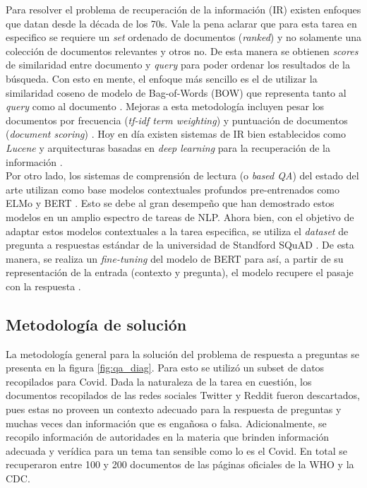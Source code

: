 Para resolver el problema de recuperación de la información (IR) existen enfoques que datan desde la década de los 70s. Vale la pena aclarar que para esta tarea en especifico se requiere un \textit{set} ordenado de documentos (\textit{ranked}) y no solamente una colección de documentos relevantes y otros no. De esta manera se obtienen \textit{scores} de similaridad entre documento y \textit{query} para poder ordenar los resultados de la búsqueda. Con esto en mente, el enfoque más sencillo es el de utilizar la similaridad coseno de modelo de Bag-of-Words (BOW) que representa tanto al \textit{query} como al documento \cite{}. Mejoras a esta metodología incluyen pesar los documentos por frecuencia (\textit{tf-idf term weighting}) y puntuación de documentos (\textit{document scoring}) \cite{}. Hoy en día existen sistemas de IR bien establecidos como \textit{Lucene} \cite{lucene} y arquitecturas basadas en \textit{deep learning} para la recuperación de la información \cite{DL_IR}. \\

Por otro lado, los sistemas de comprensión de lectura (o \textit{based QA}) del estado del arte utilizan como base modelos contextuales profundos pre-entrenados como ELMo y BERT \cite{BertQA}. Esto se debe al gran desempeño que han demostrado estos modelos en un amplio espectro de tareas de NLP. Ahora bien, con el objetivo de adaptar estos modelos contextuales a la tarea especifica, se utiliza el \textit{dataset} de pregunta a respuestas estándar de la universidad de Standford SQuAD \cite{squad}. De esta manera, se realiza un \textit{fine-tuning} del modelo de BERT para así, a partir de su representación de la entrada (contexto y pregunta), el modelo recupere el pasaje con la respuesta \cite{BERT_on_SQUAD}.

\subsection{Metodología de solución}

La metodología general para la solución del problema de respuesta a preguntas se presenta en la figura \ref{fig:qa_diag}. Para esto se utilizó un subset de datos recopilados para Covid. Dada la naturaleza de la tarea en cuestión, los documentos recopilados de las redes sociales Twitter y Reddit fueron descartados, pues estas no proveen un contexto adecuado para la respuesta de preguntas y muchas veces dan información que es engañosa o falsa. Adicionalmente, se recopilo información de autoridades en la materia que brinden información adecuada y verídica para un tema tan sensible como lo es el Covid. En total se recuperaron entre 100 y 200 documentos de las páginas oficiales de la WHO y la CDC. \\

